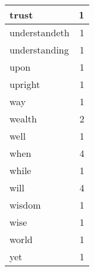\begin{center}
\begin{longtable}{l|r}
trust & 1 \\ \hline
understandeth & 1 \\ \hline
understanding & 1 \\ \hline
upon & 1 \\ \hline
upright & 1 \\ \hline
way & 1 \\ \hline
wealth & 2 \\ \hline
well & 1 \\ \hline
when & 4 \\ \hline
while & 1 \\ \hline
will & 4 \\ \hline
wisdom & 1 \\ \hline
wise & 1 \\ \hline
world & 1 \\ \hline
yet & 1 \\ \hline
\end{longtable}
\end{center}



\normalsize



